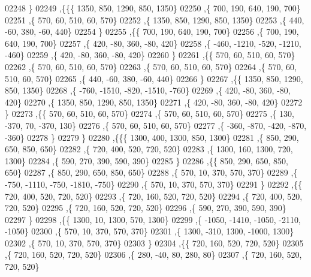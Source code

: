 \begin{DoxyCode}
02248    \}
02249   ,\{\{\{  1350,   850,  1290,   850,  1350\}
02250     ,\{   700,   190,   640,   190,   700\}
02251     ,\{   570,    60,   510,    60,   570\}
02252     ,\{  1350,   850,  1290,   850,  1350\}
02253     ,\{   440,   -60,   380,   -60,   440\}
02254     \}
02255    ,\{\{   700,   190,   640,   190,   700\}
02256     ,\{   700,   190,   640,   190,   700\}
02257     ,\{   420,   -80,   360,   -80,   420\}
02258     ,\{  -460, -1210,  -520, -1210,  -460\}
02259     ,\{   420,   -80,   360,   -80,   420\}
02260     \}
02261    ,\{\{   570,    60,   510,    60,   570\}
02262     ,\{   570,    60,   510,    60,   570\}
02263     ,\{   570,    60,   510,    60,   570\}
02264     ,\{   570,    60,   510,    60,   570\}
02265     ,\{   440,   -60,   380,   -60,   440\}
02266     \}
02267    ,\{\{  1350,   850,  1290,   850,  1350\}
02268     ,\{  -760, -1510,  -820, -1510,  -760\}
02269     ,\{   420,   -80,   360,   -80,   420\}
02270     ,\{  1350,   850,  1290,   850,  1350\}
02271     ,\{   420,   -80,   360,   -80,   420\}
02272     \}
02273    ,\{\{   570,    60,   510,    60,   570\}
02274     ,\{   570,    60,   510,    60,   570\}
02275     ,\{   130,  -370,    70,  -370,   130\}
02276     ,\{   570,    60,   510,    60,   570\}
02277     ,\{  -360,  -870,  -420,  -870,  -360\}
02278     \}
02279    \}
02280   ,\{\{\{  1300,   400,  1300,   850,  1300\}
02281     ,\{   850,   290,   650,   850,   650\}
02282     ,\{   720,   400,   520,   720,   520\}
02283     ,\{  1300,   160,  1300,   720,  1300\}
02284     ,\{   590,   270,   390,   590,   390\}
02285     \}
02286    ,\{\{   850,   290,   650,   850,   650\}
02287     ,\{   850,   290,   650,   850,   650\}
02288     ,\{   570,    10,   370,   570,   370\}
02289     ,\{  -750, -1110,  -750, -1810,  -750\}
02290     ,\{   570,    10,   370,   570,   370\}
02291     \}
02292    ,\{\{   720,   400,   520,   720,   520\}
02293     ,\{   720,   160,   520,   720,   520\}
02294     ,\{   720,   400,   520,   720,   520\}
02295     ,\{   720,   160,   520,   720,   520\}
02296     ,\{   590,   270,   390,   590,   390\}
02297     \}
02298    ,\{\{  1300,    10,  1300,   570,  1300\}
02299     ,\{ -1050, -1410, -1050, -2110, -1050\}
02300     ,\{   570,    10,   370,   570,   370\}
02301     ,\{  1300,  -310,  1300, -1000,  1300\}
02302     ,\{   570,    10,   370,   570,   370\}
02303     \}
02304    ,\{\{   720,   160,   520,   720,   520\}
02305     ,\{   720,   160,   520,   720,   520\}
02306     ,\{   280,   -40,    80,   280,    80\}
02307     ,\{   720,   160,   520,   720,   520\}

\end{DoxyCode}

